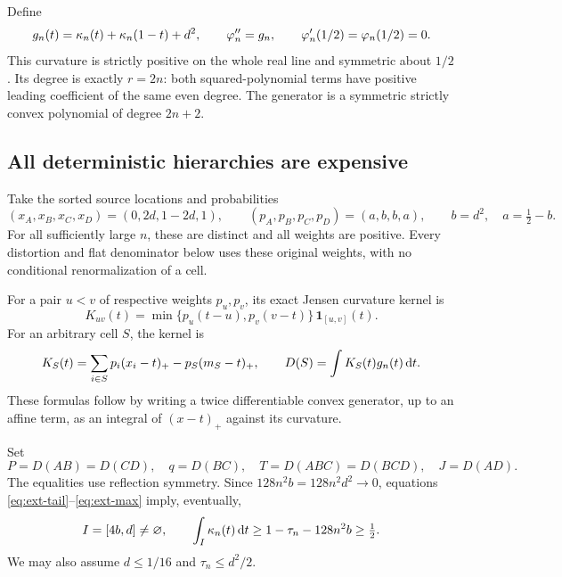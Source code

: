 Define
\begin{equation}
 g_n(t)=\kappa_n(t)+\kappa_n(1-t)+d^2,
 \qquad \varphi_n''=g_n,
 \qquad \varphi_n'(1/2)=\varphi_n(1/2)=0.
 \label{eq:ext-curvature}
\end{equation}
This curvature is strictly positive on the whole real line and symmetric
about $1/2$. Its degree is exactly $r=2n$: both squared-polynomial terms
have positive leading coefficient of the same even degree. The generator
is a symmetric strictly convex polynomial of degree $2n+2$.

\subsection{All deterministic hierarchies are expensive}
Take the sorted source locations and probabilities
\begin{equation}
 (x_A,x_B,x_C,x_D)=(0,2d,1-2d,1),\qquad
 (p_A,p_B,p_C,p_D)=(a,b,b,a),\qquad
 b=d^2,\quad a=\tfrac12-b.
 \label{eq:ext-source}
\end{equation}
For all sufficiently large $n$, these are distinct and all weights are
positive. Every distortion and flat denominator below uses these original
weights, with no conditional renormalization of a cell.

For a pair $u<v$ of respective weights $p_u,p_v$, its exact Jensen curvature
kernel is
\begin{equation}
 K_{uv}(t)=\min\{p_u(t-u),p_v(v-t)\}\,
           \mathbf1_{[u,v]}(t).
 \label{eq:ext-pairkernel}
\end{equation}
For an arbitrary cell $S$, the kernel is
\[
 K_S(t)=\sum_{i\in S}p_i(x_i-t)_+-p_S(m_S-t)_+,
 \qquad D(S)=\int K_S(t)g_n(t)\,\mathrm d t.
\]
These formulas follow by writing a twice differentiable convex generator,
up to an affine term, as an integral of $(x-t)_+$ against its curvature.

Set
\[
 P=D(AB)=D(CD),\quad q=D(BC),\quad
 T=D(ABC)=D(BCD),\quad J=D(AD).
\]
The equalities use reflection symmetry. Since
$128n^2b=128n^2d^2\to0$, equations
\eqref{eq:ext-tail}--\eqref{eq:ext-max} imply, eventually,
\begin{equation}
 I=[4b,d]\ne\varnothing,\qquad
 \int_I\kappa_n(t)\,\mathrm d t
 \ge1-\tau_n-128n^2b\ge\tfrac12.
 \label{eq:ext-core}
\end{equation}
We may also assume $d\le1/16$ and $\tau_n\le d^2/2$.

